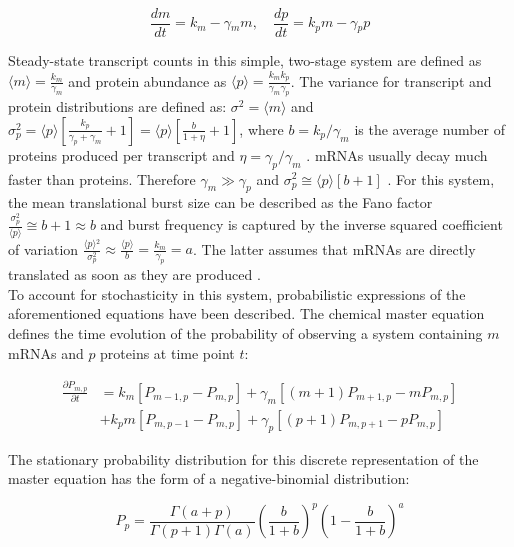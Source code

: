 \begin{equation}
\frac{dm}{dt}=k_m-\gamma{}_mm,\quad \frac{dp}{dt}=k_pm-\gamma{}_pp
\end{equation}

\doublespacing
\noindent Steady-state transcript counts in this simple, two-stage system are defined as $\langle{}m\rangle{}=\frac{k_m}{\gamma_m}$  and protein abundance as $\langle{}p\rangle{}=\frac{k_mk_p}{\gamma_m\gamma_p }$. 
The variance for transcript and protein distributions are defined as: $\sigma^2=\langle{}m\rangle{}$ and $\sigma_p^2=\langle{}p\rangle{}\left[\frac{k_p}{\gamma_p+\gamma_m}+1\right]=\langle{}p\rangle{}\left[\frac{b}{1+\eta}+1\right]$, where $b=k_p/\gamma_m$  is the average number of proteins produced per transcript and $\eta=\gamma_p/\gamma_m$  \citep{Tsimring2014, Thattai2001}. 
mRNAs usually decay much faster than proteins. Therefore $\gamma_m\gg{}\gamma_p$ and $\sigma_p^2\cong\langle{}p\rangle{}\left[b+1\right]$ \citep{Thattai2001}. 
For this system, the mean translational burst size can be described as the Fano factor $\frac{\sigma_p^2}{\langle{}p\rangle}\cong{}b+1\approx{}b$ and burst frequency is captured by the inverse squared coefficient of variation $\frac{\langle{}p\rangle{}^2}{\sigma_p^2}\approx{}\frac{\langle{}p\rangle{}}{b}=\frac{k_m}{\gamma_p}=a$. The latter assumes that mRNAs are directly translated as soon as they are produced \citep{Friedman2006}.\\

\onehalfspacing
\noindent To account for stochasticity in this system, probabilistic expressions of the aforementioned equations have been described. 
The chemical master equation defines the time evolution of the probability of observing a system containing $m$ mRNAs and $p$ proteins at time point $t$:

\begin{align}
\frac{\partial{}P_{m,p}}{\partial{}t}&=k_m\left[P_{m-1,p}-P_{m,p}\right]+\gamma_m\left[(m+1)P_{m+1,p}-mP_{m,p}\right] \nonumber \\
&+k_pm\left[P_{m,p-1}-P_{m,p}\right]+\gamma_p\left[(p+1)P_{m,p+1}-pP_{m,p}\right]
\end{align}

\noindent The stationary probability distribution for this discrete representation of the master equation has the form of a negative-binomial distribution:

\begin{equation}
P_p=\frac{\Gamma(a+p)}{\Gamma(p+1)\Gamma(a)}\left(\frac{b}{1+b}\right)^p\left(1-\frac{b}{1+b}\right)^a
\end{equation}

